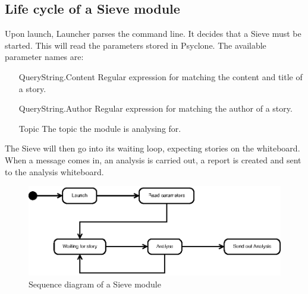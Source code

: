 \subsection{Life cycle of a Sieve module}

Upon launch, Launcher parses the command line. It decides that a Sieve must
be started. This will read the parameters stored in Psyclone. The available parameter names are:

\begin{itemize}
 \item[QueryString.Content] Regular expression for matching the content and title of a story.
 \item[QueryString.Author] Regular expression for matching the author of a story.
 \item[Topic] The topic the module is analysing for.
\end{itemize}

The Sieve will then go into its waiting loop, expecting stories on the
whiteboard. When a message comes in, an analysis is carried out, a report is
created and sent to the analysis whiteboard.

\begin{figure}[htp]
  \centering
  \includegraphics{design/image/sequence-diagram-sieve}
  \caption{Sequence diagram of a Sieve module}
\end{figure}
